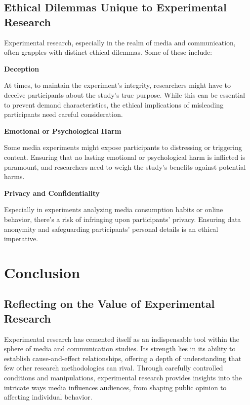 \documentclass[
  b5paper]{book}
\begin{document}
\hypertarget{ethical-dilemmas-unique-to-experimental-research}{%
\subsection*{Ethical Dilemmas Unique to Experimental Research}\label{ethical-dilemmas-unique-to-experimental-research}}

Experimental research, especially in the realm of media and communication, often grapples with distinct ethical dilemmas. Some of these include:

\textbf{Deception}

At times, to maintain the experiment's integrity, researchers might have to deceive participants about the study's true purpose. While this can be essential to prevent demand characteristics, the ethical implications of misleading participants need careful consideration.

\textbf{Emotional or Psychological Harm}

Some media experiments might expose participants to distressing or triggering content. Ensuring that no lasting emotional or psychological harm is inflicted is paramount, and researchers need to weigh the study's benefits against potential harms.

\textbf{Privacy and Confidentiality}

Especially in experiments analyzing media consumption habits or online behavior, there's a risk of infringing upon participants' privacy. Ensuring data anonymity and safeguarding participants' personal details is an ethical imperative.

\hypertarget{conclusion-5}{%
\section{Conclusion}\label{conclusion-5}}

\hypertarget{reflecting-on-the-value-of-experimental-research}{%
\subsection*{Reflecting on the Value of Experimental Research}\label{reflecting-on-the-value-of-experimental-research}}

Experimental research has cemented itself as an indispensable tool within the sphere of media and communication studies. Its strength lies in its ability to establish cause-and-effect relationships, offering a depth of understanding that few other research methodologies can rival. Through carefully controlled conditions and manipulations, experimental research provides insights into the intricate ways media influences audiences, from shaping public opinion to affecting individual behavior.
\end{document}
